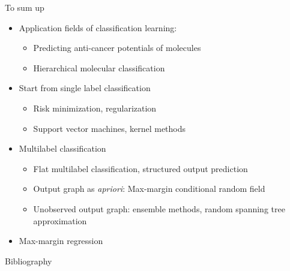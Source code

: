 \documentclass[first=dgreen,second=purple,logo=yellowexc]{aaltoslides}
\begin{document}
{\begin{frame}{To sum up}
	\begin{itemize}
		\item Application fields of classification learning:
		\begin{itemize}
			\footnotesize
			\item Predicting anti-cancer potentials of molecules
			\item Hierarchical molecular classification
		\end{itemize}
		\item Start from single label classification
		\begin{itemize}
			\footnotesize
			\item Risk minimization, regularization
			\item Support vector machines, kernel methods
		\end{itemize}
		\item Multilabel classification
		\begin{itemize}
			\footnotesize
			\item Flat multilabel classification, structured output prediction
			\item Output graph as \textit{apriori}: Max-margin conditional random field
			\item Unobserved output graph: ensemble methods, random spanning tree approximation
		\end{itemize}
		\item Max-margin regression
	\end{itemize}
\end{frame}

\fi





\begin{frame}[allowframebreaks]{Bibliography}
%

 
\end{frame}

}
\end{document}
